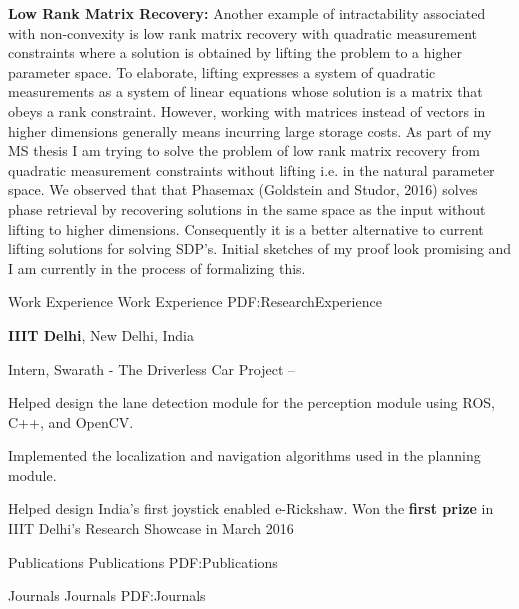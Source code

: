 \documentclass[letterpaper,MMMyyyy,nonstopmode]{simpleresumecv}
\begin{document}
\begin{Body}
{\begin{Detail}
\SubBulletItem
\textbf{Low Rank Matrix Recovery: }Another example of intractability associated with non-convexity is low rank matrix recovery with quadratic measurement constraints where a solution is
obtained by lifting the problem to a higher parameter space. To elaborate, lifting expresses a system of quadratic
measurements as a system of linear equations whose solution is a matrix that obeys a rank constraint. However,
working with matrices instead of vectors in higher dimensions generally means incurring large storage costs. As
part of my MS thesis I am trying to solve the problem of low rank matrix recovery from quadratic measurement
constraints without lifting i.e. in the natural parameter space. We observed that that Phasemax (Goldstein and Studor, 2016) solves phase retrieval by recovering solutions in the same space as the input without lifting to higher
dimensions. Consequently it is a better alternative to current lifting solutions for solving SDP’s. Initial sketches of
my proof look promising and I am currently in the process of formalizing this.
\end{Detail}



\Section
{Work Experience}
{Work Experience}
{PDF:ResearchExperience}

\Entry
{\textbf{{IIIT Delhi}},
New Delhi, India

\Gap
\BulletItem
Intern, Swarath - The Driverless Car Project
\hfill
{} --
\begin{Detail}
\SubBulletItem
Helped design the lane detection module for the perception module using ROS, C++, and OpenCV.

\SubBulletItem
Implemented the localization and navigation algorithms used in the planning module.

\SubBulletItem
Helped design India's first joystick enabled e-Rickshaw. Won the \textbf{first prize} in IIIT Delhi's Research Showcase in March 2016
\end{Detail}


\Section
{Publications}
{Publications}
{PDF:Publications}

\SubSection
{Journals}
{Journals}
{PDF:Journals}

\begingroup
\renewcommand{\MaxNumberedItem}{[88]}

}}
\end{Body}
\end{document}
